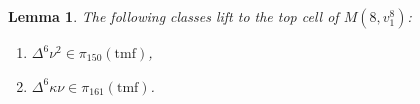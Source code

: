 \documentclass[10pt]{amsart}
\newcommand{\tmf}{\mathrm{tmf}}
\newtheorem{lem}[equation]{Lemma}
\theoremstyle{definition}
\numberwithin{equation}{section}
\numberwithin{figure}{section}
\DeclareMathOperator{\Ext}{Ext}
\begin{document}
%
%
%

\begin{lem}\label{Lem:v224nu2Lift}
The following classes lift to the top cell of $M(8,v_1^8)$:
\begin{enumerate}
\item $\Delta^6 \nu^2 \in \pi_{150}(\tmf)$,
\item $\Delta^6 \kappa \nu \in \pi_{161}(\tmf)$. 
\end{enumerate}
\end{lem}
\end{document}
